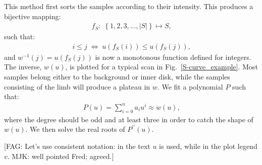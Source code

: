 \documentclass{aa}
\newcommand{\fag}[1]{\textcolor{midpurple}{[FAG: #1]}} %
\newcommand{\eqnl}[2]{\begin{eqnarray}\label{#1}#2\end{eqnarray}}
\begin{document}

This method first sorts the samples according to their intensity. This produces a bijective mapping:
\eqnl{scurve-mapping1}{
f_S:\; \left\{ 1, 2, 3, ..., |S| \right\} \mapsto S \text{,}
}
such that:
\eqnl{scurve-mapping2}{
i \le j \; \Leftrightarrow \; u \left( f_S(i) \right) \le u \left( f_S(j) \right) \text{,} 
}
and $w^{-1}(j) = u(f_S(j))$ is now a monotonous function defined for integers. The inverse, $w(u)$, is plotted for a typical scan in 
Fig.~\ref{S-curve_example}. 
Most samples belong either to the background or inner disk, while the samples consisting of the limb will produce a plateau in $w$.
We fit a polynomial $P$ such that:
\eqnl{scurve-approx}{
P(u) = \sum \limits_{i=0}^{n} a_i u^i \approx w(u) \text{,}
}
where the degree should be odd and at least three in order to catch the shape of $w(u)$. We then solve the real roots of $P^{\prime\prime}(u)$.

\fag{Let's use consistent notation: in the text $u$ is used, while in the plot legend $v$. MJK: well pointed Fred; agreed.}
\end{document}
